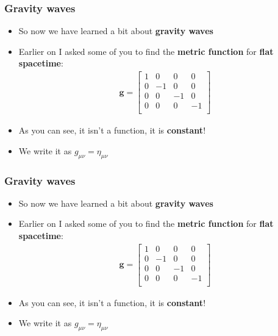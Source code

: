 \documentclass{beamer}
\begin{document}
\begin{frame}
  \frametitle{Gravity waves}
  \begin{itemize}
    \item<1-> So now we have learned a bit about \textbf{gravity waves}
    \item<2-> Earlier on I asked some of you to find the \textbf{metric function} for \textbf{flat spacetime}:
      \begin{align*}
	\mathbf{g}=
	\begin{bmatrix}
	  1 & 0 & 0 & 0\\
	  0 & -1 & 0 & 0\\
	  0 & 0 & -1 & 0\\
	  0 & 0 & 0 & -1\\
	\end{bmatrix}
      \end{align*}
    \item<3-> As you can see, it isn't a function, it is \textbf{constant}!
    \item<4-> We write it as $g_{\mu\nu}=\eta_{\mu\nu}$
  \end{itemize}
\end{frame}

\begin{frame}
  \frametitle{Gravity waves}
  \begin{itemize}
    \item<1-> So now we have learned a bit about \textbf{gravity waves}
    \item<2-> Earlier on I asked some of you to find the \textbf{metric function} for \textbf{flat spacetime}:
      \begin{align*}
	\mathbf{g}=
	\begin{bmatrix}
	  1 & 0 & 0 & 0\\
	  0 & -1 & 0 & 0\\
	  0 & 0 & -1 & 0\\
	  0 & 0 & 0 & -1\\
	\end{bmatrix}
      \end{align*}
    \item<3-> As you can see, it isn't a function, it is \textbf{constant}!
    \item<4-> We write it as $g_{\mu\nu}=\eta_{\mu\nu}$
  \end{itemize}
\end{frame}
\end{document}
